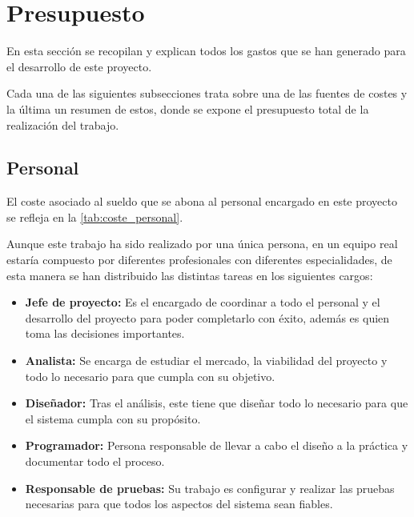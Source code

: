 \section{Presupuesto}\label{sec:presupuesto}
En esta sección se recopilan y explican todos los gastos que se han generado para el desarrollo de este proyecto.

Cada una de las siguientes subsecciones trata sobre una de las fuentes de costes y la última un resumen de estos, donde se expone el presupuesto total de la realización del trabajo.

\subsection{Personal}\label{subsec:personal}
El coste asociado al sueldo que se abona al personal encargado en este proyecto se refleja en la \autoref{tab:coste_personal}.

Aunque este trabajo ha sido realizado por una única persona, en un equipo real estaría compuesto por diferentes profesionales con diferentes especialidades, de esta manera se han distribuido las distintas tareas en los siguientes cargos:
\begin{itemize}
	\item \textbf{Jefe de proyecto:} Es el encargado de coordinar a todo el personal y el desarrollo del proyecto para poder completarlo con éxito, además es quien toma las decisiones importantes.
	\item \textbf{Analista:} Se encarga de estudiar el mercado, la viabilidad del proyecto y todo lo necesario para que cumpla con su objetivo.
	\item \textbf{Diseñador:} Tras el análisis, este tiene que diseñar todo lo necesario para que el sistema cumpla con su propósito.
	\item \textbf{Programador:} Persona responsable de llevar a cabo el diseño a la práctica y documentar todo el proceso.
	\item \textbf{Responsable de pruebas:} Su trabajo es configurar y realizar las pruebas necesarias para que todos los aspectos del sistema sean fiables.
\end{itemize}

